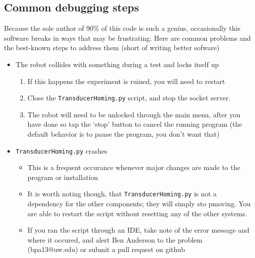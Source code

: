 \documentclass[11pt]{article}
\begin{document}
\subsection{Common debugging steps}
Because the sole author of 90\% of this code is such a genius, occasionally this software breaks in ways that may be frustrating. Here are common problems and the best-known steps to address them (short of writing better sofware)
\begin{itemize}
    \item The robot collides with something during a test and locks itself up
    \begin{enumerate}
        \item If this happens the experiment is ruined, you will need to restart
        \item Close the \texttt{TransducerHoming.py} script, and stop the socket server.
        \item The robot will need to be unlocked through the main menu, after you have done so tap the `stop' button to cancel the running program (the default behavior is to pause the program, you don't want that)
    \end{enumerate}
    \item \texttt{TransducerHoming.py} crashes
    \begin{itemize}
        \item This is a frequent occurance whenever major changes are made to the program or installation
        \item It is worth noting though, that \texttt{TransducerHoming.py} is not a dependency for the other components; they will simply sto pmoving. You are able to restart the script without resetting any of the other systems.
        \item If you ran the script through an IDE, take note of the error message and where it occured, and alert Ben Anderson to the problem (bpa13@uw.edu) or submit a pull request on github
    \end{itemize}
\end{itemize}
\end{document}
